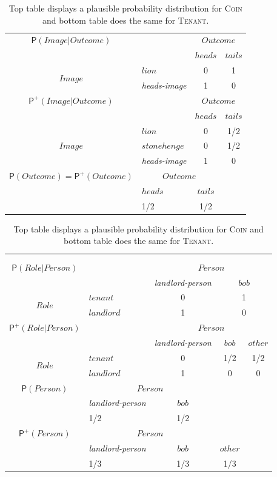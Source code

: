 \documentclass[
  11pt,
  dvipsnames,enabledeprecatedfontcommands]{scrartcl}
\newcommand{\pr}[1]{\ensuremath{\mathsf{P}(#1)}}
\newcommand{\ppr}[2]{\ensuremath{\mathsf{P}^{#1}(#2)}}
\begin{document}
\begin{table}
\begin{tabular}{clcc}
$\pr{Image \vert Outcome}$ & & \multicolumn{2}{c}{$Outcome$} \\
 &   & $heads$ & $tails$ \\
\multirow{2}{*}{$Image$} & $lion$ & 0 & 1\\
& \textit{heads-image} & 1 & 0 \\
\hline
\hline
$\ppr{+}{Image \vert Outcome}$ & & \multicolumn{2}{c}{$Outcome$} \\
&  & $heads$ & $tails$ \\
\multirow{3}{*}{$Image$} & $lion$ & 0 & 1/2\\ 
& $stonehenge$ & 0 & 1/2 \\
& \textit{heads-image} & 1 & 0 \\
\hline
\hline
$\pr{Outcome}=\ppr{+}{Outcome}$ & \multicolumn{2}{c}{$Outcome$} & \\
&  $heads$ & $tails$ & \\
& 1/2 & 1/2 & \\
\end{tabular}


\begin{tabular}{clccc}
&&&&\\
&&&&\\
$\pr{Role \vert Person}$ & & \multicolumn{3}{c}{$Person$} \\
 &   & \textit{landlord-person}  & \multicolumn{2}{c}{$bob$} \\
\multirow{2}{*}{$Role$} & $tenant$ & 0 & \multicolumn{2}{c}{1}\\
& $landlord$  & 1 & \multicolumn{2}{c}{0} \\
\hline
\hline
$\ppr{+}{Role \vert Person}$ & & \multicolumn{3}{c}{$Person$} \\
&  & \textit{landlord-person} & $bob$ & $other$ \\
\multirow{2}{*}{$Role$} & $tenant$ & 0 & 1/2 & 1/2\\ 
& $landlord$ & 1 & 0 & 0 \\
\hline
\hline
$\pr{Person}$ & \multicolumn{2}{c}{$Person$} & \\
&  \textit{landlord-person} & $bob$ & \\
& 1/2 & 1/2 & \\
\hline
\hline
$\ppr{+}{Person}$ & \multicolumn{2}{c}{$Person$} & \\
&  \textit{landlord-person} & $bob$ & $other$ \\
& 1/3 & 1/3 & 1/3 \\
\end{tabular}
\caption{Top table displays a plausible probability distribution for \textsc{Coin} and bottom table does the same for \textsc{Tenant}.}
\label{table:coin-tenant}
\end{table}
\end{document}
